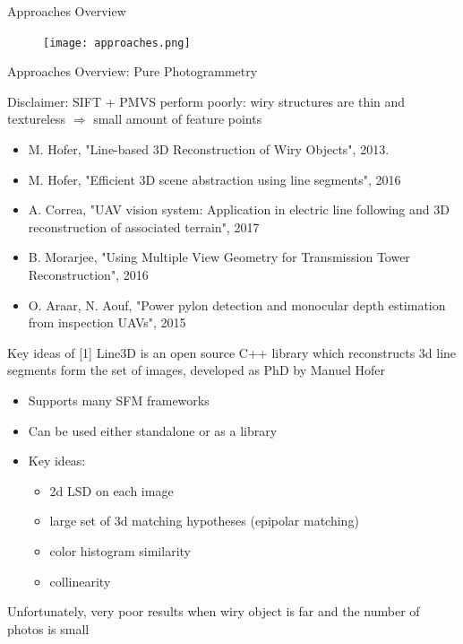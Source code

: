 \documentclass{beamer}
\begin{document}
\begin{frame}[t, fragile]{Approaches Overview}
\begin{figure}
\centering
\texttt{[image: approaches.png]}
\label{fig:line3d_output}
\end{figure}
\end{frame}
\begin{frame}[t, fragile]{Approaches Overview: Pure Photogrammetry}

Disclaimer: SIFT + PMVS perform poorly: wiry structures are thin and textureless $\Rightarrow$ small amount of feature points 

\begin{itemize}
\item [1] M. Hofer, "Line-based 3D Reconstruction of Wiry Objects", 2013.
\item [1'] M. Hofer, "Efficient 3D scene abstraction using line segments", 2016
\item [2] A. Correa, "UAV vision system: Application in electric line following and 3D reconstruction of associated terrain", 2017
\item [3] B. Morarjee, "Using Multiple View Geometry for Transmission Tower Reconstruction", 2016

\item [4] O. Araar, N. Aouf, "Power pylon detection and monocular depth
estimation from inspection UAVs", 2015
\end{itemize}
\end{frame}

\begin{frame}[t, fragile]{Key ideas of [1]}
Line3D is an open source C++ library which reconstructs 3d line segments form the set of images, developed as PhD by Manuel Hofer
\begin{itemize}

\item Supports many SFM frameworks
\item Can be used either standalone or as a library
\item Key ideas: 
\begin{itemize}
\item 2d LSD on each image
\item large set of 3d matching hypotheses (epipolar matching)
\item color histogram similarity
\item collinearity
\end{itemize}
\end{itemize}
Unfortunately, very poor results when wiry object is far and the number of photos is small
\end{frame}
\end{document}
